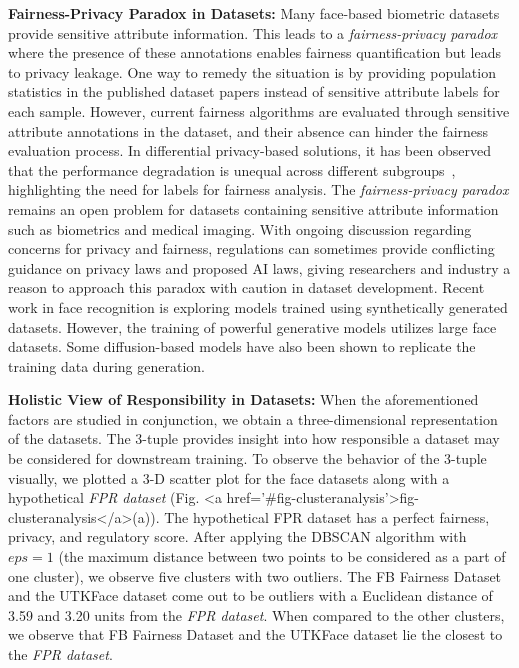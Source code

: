 \documentclass[journal]{IEEEtran}
\begin{document}
\noindent \textbf{Fairness-Privacy Paradox in Datasets:} Many face-based biometric datasets provide sensitive attribute information. This leads to a \textit{fairness-privacy paradox} where the presence of these annotations enables fairness quantification but leads to privacy leakage. One way to remedy the situation is by providing population statistics in the published dataset papers instead of sensitive attribute labels for each sample. However, current fairness algorithms are evaluated through sensitive attribute annotations in the dataset, and their absence can hinder the fairness evaluation process. In differential privacy-based solutions, it has been observed that the performance degradation is unequal across different subgroups~\cite{bagdasaryan2019differential}, highlighting the need for labels for fairness analysis. The \textit{fairness-privacy paradox} remains an open problem for datasets containing sensitive attribute information such as biometrics and medical imaging. With ongoing discussion regarding concerns for privacy and fairness, regulations can sometimes provide conflicting guidance on privacy laws and proposed AI laws, giving researchers and industry a reason to approach this paradox with caution in dataset development. Recent work in face recognition is exploring models trained using synthetically generated datasets\cite{qiu2021synface, melzi2023gandiffface, kim2023dcface}. However, the training of powerful generative models utilizes large face datasets. Some diffusion-based models have also been shown to replicate the training data during generation.

\noindent \textbf{Holistic View of Responsibility in Datasets:} When the aforementioned factors are studied in conjunction, we obtain a three-dimensional representation of the datasets. The 3-tuple provides insight into how responsible a dataset may be considered for downstream training. To observe the behavior of the 3-tuple visually, we plotted a 3-D scatter plot for the face datasets along with a hypothetical \textit{FPR dataset} (Fig. <a href='#fig-clusteranalysis'>fig-clusteranalysis</a>(a)). The hypothetical FPR dataset has a perfect fairness, privacy, and regulatory score. After applying the DBSCAN algorithm with $eps=1$ (the maximum distance between two points to be considered as a part of one cluster), we observe five clusters with two outliers. The FB Fairness Dataset and the UTKFace dataset come out to be outliers with a Euclidean distance of 3.59 and 3.20 units from the \textit{FPR dataset}. 
When compared to the other clusters, we observe that FB Fairness Dataset and the UTKFace dataset lie the closest to the \textit{FPR dataset}.
\end{document}
